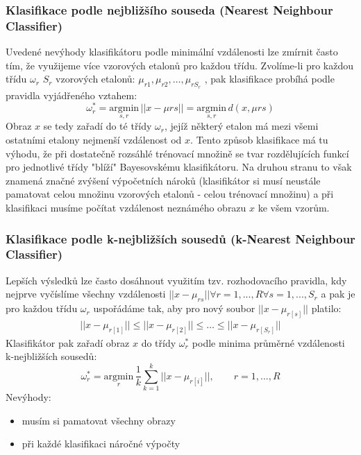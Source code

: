 \subsubsection*{Klasifikace podle nejbližšího souseda (Nearest Neighbour Classifier)}
Uvedené nevýhody klasifikátoru podle minimální vzdálenosti lze zmírnit často tím, že využijeme více vzorových etalonů pro každou třídu. Zvolíme-li pro každou třídu $ \omega_r $ $ S_r $ vzorových etalonů: $ \mu_{r1}, \mu_{r2}, \dots, \mu_{rS_r} $ , pak klasifikace probíhá podle pravidla vyjádřeného vztahem:
\begin{equation}
\omega_r^* = \underset{s,r}{\mathrm{argmin}} \, ||x-\mu{rs}|| = \underset{s,r}{\mathrm{argmin}} \, d(x, \mu{rs})
\end{equation}
Obraz $ x $ se tedy zařadí do té třídy $ \omega_r $, jejíž některý etalon má mezi všemi ostatními etalony nejmenší vzdálenost od $ x $. Tento způsob klasifikace má tu výhodu, že při dostatečně rozsáhlé trénovací množině se tvar rozdělujících funkcí pro jednotlivé třídy "blíží" Bayesovskému klasifikátoru. Na druhou stranu to však znamená značné zvýšení výpočetních nároků (klasifikátor si musí neustále pamatovat celou množinu vzorových etalonů - celou trénovací množinu) a při klasifikaci musíme počítat vzdálenost neznámého obrazu $ x $ ke všem vzorům.

\subsubsection*{Klasifikace podle k-nejbližších sousedů (k-Nearest Neighbour Classifier)}
Lepších výsledků lze často dosáhnout využitím tzv. rozhodovacího pravidla, kdy nejprve vyčíslíme všechny vzdálenosti $ ||x - \mu_{rs}|| \forall r=1,...,R \forall s=1,...,S_r $ a pak je pro každou třídu $ \omega_r $ uspořádáme tak, aby pro nový soubor $ ||x - \mu_{r[s]}|| $ platilo:
\begin{align*}
||x - \mu_{r[1]}|| \leq ||x - \mu_{r[2]}|| \leq \dots \leq ||x - \mu_{r[S_r]}||
\end{align*}
Klasifikátor pak zařadí obraz $ x $ do třídy $ \omega_r^* $ podle minima průměrné vzdálenosti k-nejbližších sousedů:
\begin{equation}
\omega_r^* = \underset{r}{\mathrm{argmin}} \, \frac{1}{k} \displaystyle{\sum_{k=1}^k} ||x - \mu_{r[i]}||, \qquad r=1,...,R
\end{equation}
Nevýhody:
\begin{itemize}
\item musím si pamatovat všechny obrazy
\item při každé klasifikaci náročné výpočty
\end{itemize}

